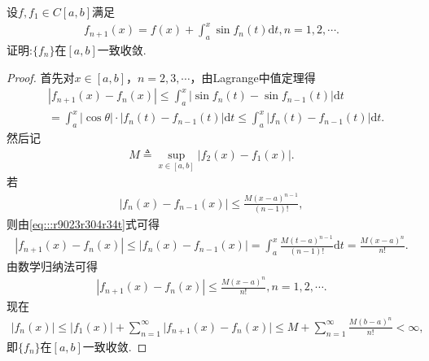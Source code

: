 \documentclass[../../main.tex]{subfiles}%
\begin{document}
\begin{example}
设$f,f_1 \in C[a,b]$满足
\begin{align*}
f_{n+1}(x) = f(x) + \int_a^x \sin f_n(t)\mathrm{d}t, n = 1,2,\cdots.
\end{align*}
证明:$\{f_n\}$在$[a,b]$一致收敛.
\end{example}
\begin{proof}
首先对$x \in [a,b]$，$n = 2,3,\cdots$，由Lagrange中值定理得
\begin{align}
&|f_{n+1}(x) - f_n(x)| \leqslant \int_a^x |\sin f_n(t) - \sin f_{n-1}(t)| \mathrm{d}t \nonumber \\
&= \int_a^x |\cos \theta| \cdot |f_n(t) - f_{n-1}(t)| \mathrm{d}t \leqslant \int_a^x |f_n(t) - f_{n-1}(t)| \mathrm{d}t.\label{eq:::r9023r304r34t}
\end{align}
然后记
\begin{align*}
M \triangleq \sup_{x \in [a,b]} |f_2(x) - f_1(x)|.
\end{align*}
若
\begin{align*}
|f_n(x) - f_{n-1}(x)| \leqslant \frac{M(x - a)^{n-1}}{(n - 1)!},
\end{align*}
则由\eqref{eq:::r9023r304r34t}式可得
\begin{align*}
|f_{n+1}(x)-f_n(x)|\leqslant |f_n(x)-f_{n-1}(x)|=\int_a^x{\frac{M(t-a)^{n-1}}{(n-1)!}\mathrm{d}t}=\frac{M(x-a)^n}{n!}.
\end{align*}
由数学归纳法可得
\begin{align*}
|f_{n+1}(x) - f_n(x)| \leqslant \frac{M(x - a)^n}{n!}, n = 1,2,\cdots.
\end{align*}
现在
\begin{align*}
\left| f_n\left( x \right) \right|\leqslant \left| f_1\left( x \right) \right|+\sum_{n=1}^{\infty}{|f_{n+1}(x)}-f_n(x)|\leqslant M+\sum_{n=1}^{\infty}{\frac{M(b-a)^n}{n!}}<\infty ,
\end{align*}
即$\{f_n\}$在$[a,b]$一致收敛.
\end{proof}
\end{document}
